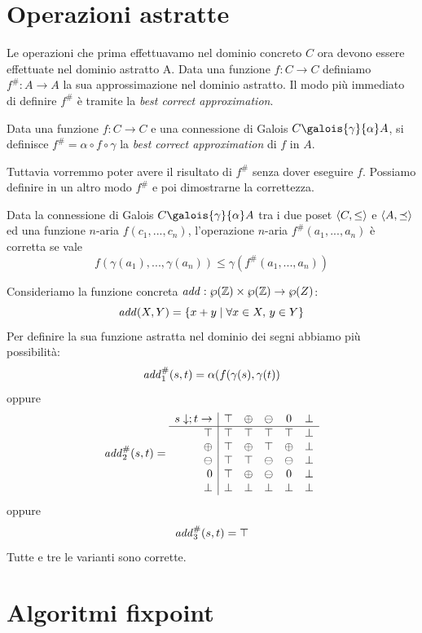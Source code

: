 \section{Operazioni astratte}

Le operazioni che prima effettuavamo nel dominio concreto $C$ ora devono essere effettuate nel dominio astratto A. Data una funzione $f : C \to C$ definiamo $f^{\#} : A \to A$ la sua approssimazione nel dominio astratto. Il modo più immediato di definire $f^{\#}$ è tramite la \emph{best correct approximation}.

\begin{definition}
Data una funzione $f : C \to C$ e una connessione di Galois $C \galois{\gamma}{\alpha} A$, si definisce $f^{\#} = \alpha \circ f \circ \gamma$ la \emph{best correct approximation} di $f$ in $A$.
\end{definition}

Tuttavia vorremmo poter avere il risultato di $f^{\#}$ senza dover eseguire $f$. Possiamo definire in un altro modo $f^{\#}$ e poi dimostrarne la correttezza.

\begin{definition}
Data la connessione di Galois $C \galois{\gamma}{\alpha} A$ tra i due poset $\langle C, \le \rangle$ e $\langle A, \preceq \rangle$ ed una funzione $n$-aria $f(c_1, ..., c_n)$, l'operazione $n$-aria $f^{\#}(a_1, ..., a_n)$ è corretta se vale
\[ f(\gamma(a_1), ..., \gamma(a_n)) \le \gamma(f^{\#}(a_1, ..., a_n)) \]
\end{definition}

\begin{example}
Consideriamo la funzione concreta $\mathit{add} : \wp(\mathbb{Z}) \times \wp(\mathbb{Z}) \to \wp(Z)$:
\[ \mathit{add}(X, Y) = \{ x + y \mid \forall x \in X, \, y \in Y \} \]
Per definire la sua funzione astratta nel dominio dei segni abbiamo più possibilità:
\[ \mathit{add}^{\#}_1(s, t) = \alpha(f(\gamma(s), \gamma(t)) \]
oppure
\[ \mathit{add}^{\#}_2(s,t) = \begin{array}{r|ccccc}
    s \downarrow; t \rightarrow & \top & \oplus & \ominus & 0       & \bot  \\\hline
    \top                      & \top   & \top   & \top    & \top    & \bot  \\
    \oplus                    & \top   & \oplus & \top    & \oplus  & \bot  \\
    \ominus                   & \top   & \top   & \ominus & \ominus & \bot  \\
    0                         & \top   & \oplus & \ominus & 0       & \bot  \\
    \bot                      & \bot   & \bot   & \bot    & \bot    & \bot  \\
\end{array} \]
oppure 
\[ \mathit{add}^{\#}_3(s,t) = \top \]
Tutte e tre le varianti sono corrette. 
\end{example}

\section{Algoritmi fixpoint}


